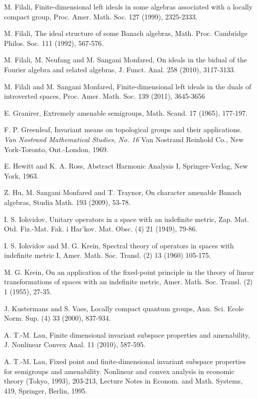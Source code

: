 \documentclass{tran-l}
\numberwithin{equation}{section}
\theoremstyle{definition}
\theoremstyle{remark}
\begin{document}
\begin{thebibliography}{99}
M. Filali, Finite-dimensional left ideals in some algebras associated with a locally compact group, Proc. Amer. Math. Soc.  127  (1999), 2325-2333.

M. Filali, The ideal structure of some Banach algebras, Math. Proc. Cambridge Philos. Soc.  111 (1992), 567-576.

M. Filali, M. Neufang and M. Sangani Monfared, On ideals in the bidual of the Fourier algebra and related algebras, J. Funct. Anal. 258 (2010), 3117-3133.

M. Filali and M. Sangani Monfared,
 Finite-dimensional left ideals in the duals of introverted spaces,
 Proc. Amer. Math. Soc. 139 (2011), 3645-3656
 
E. Granirer, Extremely amenable semigroups, Math. Scand. {17} (1965), 177-197.

F. P. Greenleaf, 
 Invariant means on topological groups and their applications. {\it Van Nostrand Mathematical Studies, No. 16} Van Nostrand Reinhold Co., New York-Toronto, Ont.-London, 1969.

E. Hewitt and K. A. Ross, Abstract Harmonic Analysis I, Springer-Verlag, New York,  1963.

Z. Hu, M. Sangani Monfared and T. Traynor, On character amenable Banach algebras, Studia Math. 193 (2009), 53-78.

I. S. Iohvidov,
Unitary operators in a space with an indefinite metric, Zap. Mat. Otd. Fiz.-Mat. Fak. i Har'kov. Mat. Obsc. (4) 21 (1949), 79-86.

I. S. Iohvidov and M. G. Krein, Spectral theory of operators in spaces with indefinite metric I, Amer. Math. Soc. Transl. (2) 13 (1960) 105-175.

M. G. Krein, On an application of the fixed-point principle in the theory of linear transformations of spaces with an indefinite metric, Amer. Math. Soc. Transl. (2) 1 (1955), 27-35. 

J. Kustermans and S. Vaes, Locally compact quantum groups, Ann. Sci. Ecole Norm. Sup. (4) 33 (2000), 837-934. 

A. T.-M. Lau, Finite dimensional invariant subspace properties and amenability, J. Nonlinear Convex Anal. 11 (2010), 587-595.

A. T.-M. Lau, Fixed point and finite-dimensional invariant subspace properties for semigroups and amenability. Nonlinear and convex analysis in economic theory (Tokyo, 1993), 203-213, 
Lecture Notes in Econom. and Math. Systems, 419, Springer, Berlin, 1995. 


\end{thebibliography}
\end{document}
